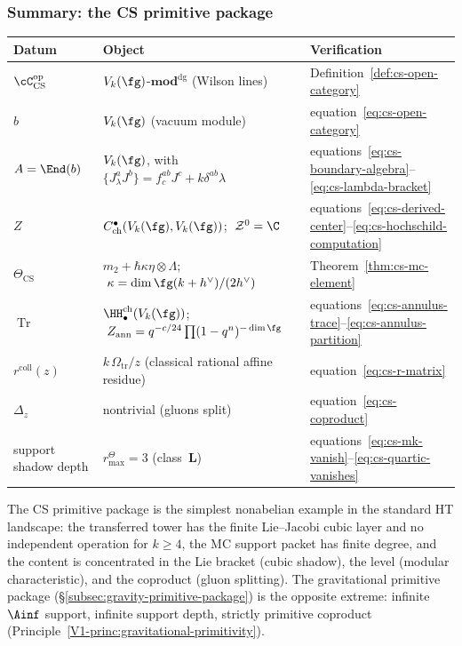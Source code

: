 \subsubsection*{Summary: the CS primitive package}

\begin{center}
\small
\renewcommand{\arraystretch}{1.15}
\begin{tabular}{lll}
\textbf{Datum} & \textbf{Object} & \textbf{Verification} \\
\hline
$\cC_{\mathrm{CS}}^{\mathrm{op}}$
 & $V_k(\fg)$-$\mathbf{mod}^{\mathrm{dg}}$ (Wilson lines)
 & Definition~\ref{def:cs-open-category} \\[2pt]
$b$
 & $V_k(\fg)$ (vacuum module)
 & equation~\eqref{eq:cs-open-category} \\[2pt]
$A = \End(b)$
 & $V_k(\fg)$, with $\{J^a_\lambda J^b\} = f^{ab}_c J^c + k\delta^{ab}\lambda$
 & equations~\eqref{eq:cs-boundary-algebra}--\eqref{eq:cs-lambda-bracket} \\[2pt]
$Z$
 & $C^\bullet_{\mathrm{ch}}(V_k(\fg), V_k(\fg))$;
 $\;\mathcal{Z}^0 = \C$
 & equations~\eqref{eq:cs-derived-center}--\eqref{eq:cs-hochschild-computation} \\[2pt]
$\Theta_{\mathrm{CS}}$
 & $m_2 + \hbar\kappa\eta\otimes\Lambda$;
 $\;\kappa = \dim\fg(k+h^\vee)/(2h^\vee)$
 & Theorem~\ref{thm:cs-mc-element} \\[2pt]
$\operatorname{Tr}$
 & $\HH^{\mathrm{ch}}_\bullet(V_k(\fg))$;
 $\;Z_{\mathrm{ann}} = q^{-c/24}\prod(1-q^n)^{-\dim\fg}$
 & equations~\eqref{eq:cs-annulus-trace}--\eqref{eq:cs-annulus-partition} \\[2pt]
$r^{\mathrm{coll}}(z)$
 & $k\,\Omega_{\mathrm{tr}}/z$ (classical rational affine residue)
 & equation~\eqref{eq:cs-r-matrix} \\[2pt]
$\Delta_z$
 & nontrivial (gluons split)
 & equation~\eqref{eq:cs-coproduct} \\[2pt]
support shadow depth
 & \(r^\Theta_{\max}=3\) (class~$\mathbf{L}$)
 & equations~\eqref{eq:cs-mk-vanish}--\eqref{eq:cs-quartic-vanishes}
\end{tabular}
\end{center}

The CS primitive package is the simplest nonabelian example in the standard HT landscape: the transferred tower has the finite Lie--Jacobi cubic layer and no independent operation for $k \ge 4$, the MC support packet has finite degree, and the content is concentrated in the Lie bracket (cubic shadow), the level (modular characteristic), and the coproduct (gluon splitting). The gravitational primitive package (\S\ref{subsec:gravity-primitive-package}) is the opposite extreme: infinite $\Ainf$ support, infinite support depth, strictly primitive coproduct (Principle~\ref*{V1-princ:gravitational-primitivity}).

